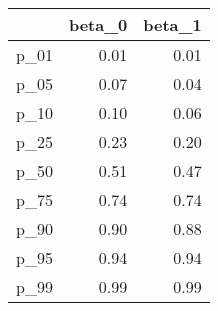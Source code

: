 \begin{table}[ht]
\centering
\begin{tabular}{rrr}
  \hline
 & beta\_0 & beta\_1 \\ 
  \hline
p\_01 & 0.01 & 0.01 \\ 
  p\_05 & 0.07 & 0.04 \\ 
  p\_10 & 0.10 & 0.06 \\ 
  p\_25 & 0.23 & 0.20 \\ 
  p\_50 & 0.51 & 0.47 \\ 
  p\_75 & 0.74 & 0.74 \\ 
  p\_90 & 0.90 & 0.88 \\ 
  p\_95 & 0.94 & 0.94 \\ 
  p\_99 & 0.99 & 0.99 \\ 
   \hline
\end{tabular}
\end{table}
